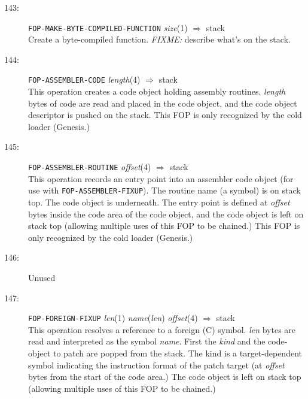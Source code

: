 \begin{description}
\item[143:] \hspace{2em} {\tt FOP-MAKE-BYTE-COMPILED-FUNCTION} \hspace{2em} {\it size}(1) \hspace{2em} $\Rightarrow$ \hspace{2em} stack\\
Create a byte-compiled function.  {\it FIXME:} describe what's on the stack.

\item[144:] \hspace{2em} {\tt FOP-ASSEMBLER-CODE} \hspace{2em} {\it length}(4)
\hspace{2em} $\Rightarrow$ \hspace{2em} stack\\
This operation creates a code object holding assembly routines.  {\it length}
bytes of code are read and placed in the code object, and the code object
descriptor is pushed on the stack.  This FOP is only recognized by the cold
loader (Genesis.)

\item[145:] \hspace{2em} {\tt FOP-ASSEMBLER-ROUTINE} \hspace{2em} {\it offset}(4)
\hspace{2em} $\Rightarrow$ \hspace{2em} stack\\
This operation records an entry point into an assembler code object (for use
with {\tt FOP-ASSEMBLER-FIXUP}).  The routine name (a symbol) is on stack top.
The code object is underneath.  The entry point is defined at {\it offset}
bytes inside the code area of the code object, and the code object is left on
stack top (allowing multiple uses of this FOP to be chained.)  This FOP is only
recognized by the cold loader (Genesis.)

\item[146:] Unused

\item[147:] \hspace{2em} {\tt FOP-FOREIGN-FIXUP} \hspace{2em} {\it len}(1)
\hspace{2em} {\it name}({\it len})
\hspace{2em} {\it offset}(4) \hspace{2em} $\Rightarrow$ \hspace{2em} stack\\
This operation resolves a reference to a foreign (C) symbol.  {\it len} bytes
are read and interpreted as the symbol {\it name}.  First the {\it kind} and the
code-object to patch are popped from the stack.  The kind is a target-dependent
symbol indicating the instruction format of the patch target (at {\it offset}
bytes from the start of the code area.)  The code object is left on
stack top (allowing multiple uses of this FOP to be chained.)


\end{description}
